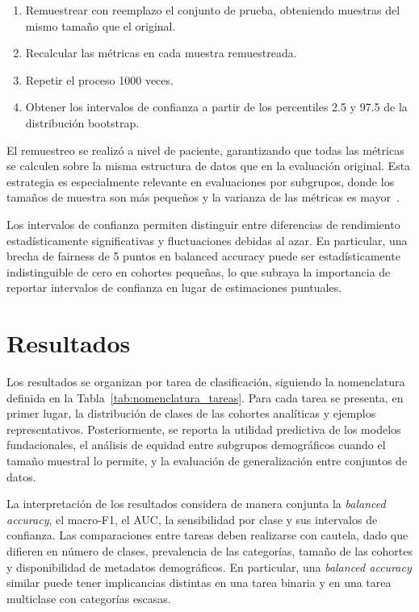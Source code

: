 \begin{enumerate}
    \item Remuestrear con reemplazo el conjunto de prueba, obteniendo muestras del mismo tamaño que el original.
    \item Recalcular las métricas en cada muestra remuestreada.
    \item Repetir el proceso 1000 veces.
    \item Obtener los intervalos de confianza a partir de los percentiles 2.5 y 97.5 de la distribución bootstrap.
\end{enumerate}

El remuestreo se realizó a nivel de paciente, garantizando que todas las métricas se calculen sobre la misma estructura de datos que en la evaluación original. Esta estrategia es especialmente relevante en evaluaciones por subgrupos, donde los tamaños de muestra son más pequeños y la varianza de las métricas es mayor~\parencite{matos2025critical}.

Los intervalos de confianza permiten distinguir entre diferencias de rendimiento estadísticamente significativas y fluctuaciones debidas al azar. En particular, una brecha de fairness de 5 puntos en balanced accuracy puede ser estadísticamente indistinguible de cero en cohortes pequeñas, lo que subraya la importancia de reportar intervalos de confianza en lugar de estimaciones puntuales.


\section{Resultados}
\label{sec:resultados}

Los resultados se organizan por tarea de clasificación, siguiendo la nomenclatura definida en la Tabla~\ref{tab:nomenclatura_tareas}. Para cada tarea se presenta, en primer lugar, la distribución de clases de las cohortes analíticas y ejemplos representativos. Posteriormente, se reporta la utilidad predictiva de los modelos fundacionales, el análisis de equidad entre subgrupos demográficos cuando el tamaño muestral lo permite, y la evaluación de generalización entre conjuntos de datos.

La interpretación de los resultados considera de manera conjunta la \textit{balanced accuracy}, el macro-F1, el AUC, la sensibilidad por clase y sus intervalos de confianza. Las comparaciones entre tareas deben realizarse con cautela, dado que difieren en número de clases, prevalencia de las categorías, tamaño de las cohortes y disponibilidad de metadatos demográficos. En particular, una \textit{balanced accuracy} similar puede tener implicancias distintas en una tarea binaria y en una tarea multiclase con categorías escasas.

